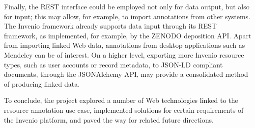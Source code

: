 Finally, the REST  interface could be employed not only for data output, but
also for input; this may allow, for example, to import annotations from other
systems. The Invenio framework already supports data input through its REST
framework, as implemented, for example, by the ZENODO deposition API. Apart
from importing linked Web  data, annotations from desktop applications such as
Mendeley can be of interest. On a higher level, exporting more Invenio resource
types, such as user accounts or record metadata, to JSON-LD compliant documents,
through the JSONAlchemy API, may provide a consolidated method of producing
linked data.

To conclude, the project explored a number of Web technologies linked to the
resource annotation use case, implemented solutions for certain requirements of
the Invenio platform, and paved the way for related future directions.
